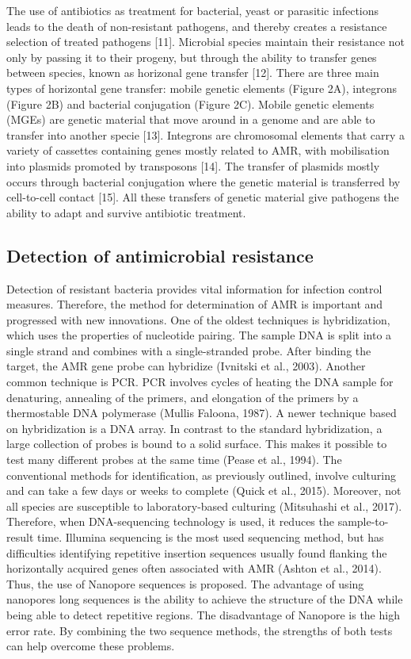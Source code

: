 \documentclass[a4paper,num-refs]{oup-contemporary}
\begin{document}
The use of antibiotics as treatment for bacterial, yeast or parasitic infections leads to the death of non-resistant pathogens, and thereby creates a resistance selection of treated pathogens [11]. Microbial species maintain their resistance not only by passing it to their progeny, but through the ability to transfer genes between species, known as horizonal gene transfer [12]. There are three main types of horizontal gene transfer: mobile genetic elements (Figure 2A), integrons (Figure 2B) and bacterial conjugation (Figure 2C). Mobile genetic elements (MGEs) are genetic material that move around in a genome and are able to transfer into another specie [13]. Integrons are chromosomal elements that carry a variety of cassettes containing genes mostly related to AMR, with mobilisation into plasmids promoted by transposons [14]. The transfer of plasmids mostly occurs through bacterial conjugation where the genetic material is transferred by cell-to-cell contact [15]. All these transfers of genetic material give pathogens the ability to adapt and survive antibiotic treatment.

\subsection{Detection of antimicrobial resistance}
Detection of resistant bacteria provides vital information for infection control measures. Therefore, the method for determination of AMR is important and progressed with new innovations.  One of the oldest techniques is hybridization, which uses the properties of nucleotide pairing. The sample DNA is split into a single strand and combines with a single-stranded probe. After binding the target, the AMR gene probe can hybridize (Ivnitski et al., 2003). Another common technique is PCR. PCR involves cycles of heating the DNA sample for denaturing, annealing of the primers, and elongation of the primers by a thermostable DNA polymerase (Mullis  Faloona, 1987). A newer technique based on hybridization is a DNA array. In contrast to the standard hybridization, a large collection of probes is bound to a solid surface. This makes it possible to test many different probes at the same time (Pease et al., 1994). The conventional methods for identification, as previously outlined, involve culturing and can take a few days or weeks to complete (Quick et al., 2015). Moreover, not all species are susceptible to laboratory-based culturing (Mitsuhashi et al., 2017). Therefore, when DNA-sequencing technology is used, it reduces the sample-to-result time. Illumina sequencing is the most used sequencing method, but has difficulties identifying repetitive insertion sequences usually found flanking the horizontally acquired genes often associated with AMR (Ashton et al., 2014). Thus, the use of Nanopore sequences is proposed. The advantage of using nanopores long sequences is the ability to achieve the structure of the DNA while being able to detect repetitive regions. The disadvantage of Nanopore is the high error rate. By combining the two sequence methods, the strengths of both tests can help overcome these problems.
\end{document}
